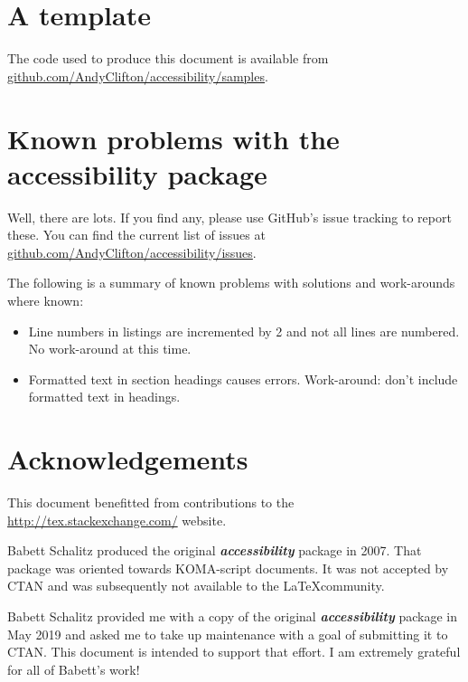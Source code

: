 \documentclass[10pt,oneocolumn]{article}
\newcommand{\packagename}[1]{\textbf{\emph{#1}}}
\begin{document}
\section{A template}
The code used to produce this document is available from \href{https://github.com/AndyClifton/accessibility/samples}{github.com/AndyClifton/accessibility/samples}.

\section{Known problems with the accessibility package}
Well, there are lots. If you find any, please use GitHub's issue tracking to report these. You can find the current list of issues at \href{https://github.com/AndyClifton/accessibility/issues}{github.com/AndyClifton/accessibility/issues}.

The following is a summary of known problems with solutions and work-arounds where known:
\begin{itemize}
\item Line numbers in listings are incremented by 2 and not all lines are numbered. No work-around at this time.
\item Formatted text in section headings causes errors. Work-around: don't include formatted text in headings.
\end{itemize}

\section*{Acknowledgements}
This document benefitted from contributions to the \href{http://tex.stackexchange.com/}{http://tex.stackexchange.com/} website.

Babett Schalitz produced the original \packagename{accessibility} package in 2007. That package was oriented towards KOMA-script documents. It was not accepted by CTAN and was subsequently not available to the \LaTeX community.

Babett Schalitz provided me with a copy of the original \packagename{accessibility} package in May 2019 and asked me to take up maintenance with a goal of submitting it to CTAN. This document is intended to support that effort. I am extremely grateful for all of Babett's work!
\end{document}
